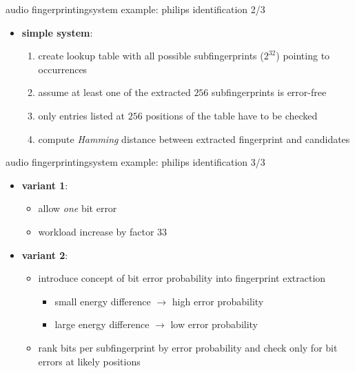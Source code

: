         \begin{frame}{audio fingerprinting}{system example: philips identification 2/3}
            \begin{itemize}
                \item \textbf{simple system}:
                    \begin{enumerate}
                        \item	create lookup table with all possible subfingerprints ($2^{32}$) pointing to occurrences
                        \bigskip
                        \item<2->	assume at least one of the extracted $256$ subfingerprints is error-free\\
                        \item<2->[$\Rightarrow$] only entries listed at $256$ positions of the table have to be checked
                        \bigskip
                        \item<3->	compute \textit{Hamming} distance between extracted fingerprint and candidates
                    \end{enumerate}
            \end{itemize}
        \end{frame}
        
        \begin{frame}{audio fingerprinting}{system example: philips identification 3/3}
            \begin{itemize}
                \item \textbf{variant 1}: 
                    \begin{itemize}
                        \item	allow \textit{one} bit error 
                        \item<2->[$\Rightarrow$] workload increase by factor $33$
                     \end{itemize}
               \bigskip
                \item<3-> \textbf{variant 2}: 
                    \begin{itemize}
                        \item<3->	introduce concept of bit error probability into fingerprint extraction
                            \begin{itemize}
                                \item	small energy difference $\rightarrow$ high error probability
                                \item	large energy difference $\rightarrow$ low error probability
                            \end{itemize}
                        \bigskip
                        \item<4->	rank bits per subfingerprint by error probability and check only for bit errors at likely positions
                    \end{itemize}
            \end{itemize}
        \end{frame}

